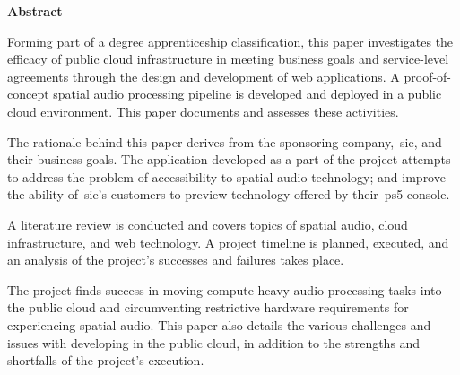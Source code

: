 \thispagestyle{plain}
\begin{center}
    \vspace{0.9cm}
    \textbf{Abstract}
\end{center}

Forming part of a degree apprenticeship classification, this paper investigates the efficacy of public cloud infrastructure in meeting business goals and service-level agreements through the design and development of web applications.
A proof-of-concept spatial audio processing pipeline is developed and deployed in a public cloud environment.
This paper documents and assesses these activities.

The rationale behind this paper derives from the sponsoring company,~\gls{sie}, and their business goals.
The application developed as a part of the project attempts to address the problem of accessibility to spatial audio technology;
and improve the ability of~\gls{sie}'s customers to preview technology offered by their~\gls{ps5} console.

A literature review is conducted and covers topics of spatial audio, cloud infrastructure, and web technology.
A project timeline is planned, executed, and an analysis of the project's successes and failures takes place.

The project finds success in moving compute-heavy audio processing tasks into the public cloud and circumventing restrictive hardware requirements for experiencing spatial audio.
This paper also details the various challenges and issues with developing in the public cloud, in addition to the strengths and shortfalls of the project's execution.
